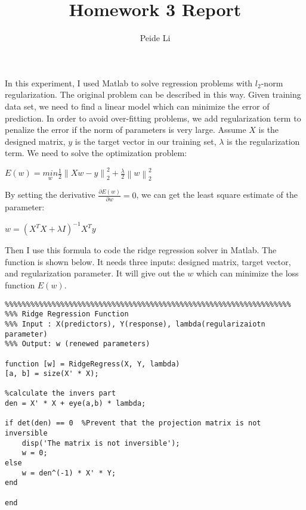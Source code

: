 \documentclass[letterpaper,12pt]{article}
\title{Homework 3 Report}
\author{Peide Li}
\begin{document}
\maketitle

In this experiment, I used Matlab to solve regression problems with $l_{2}$-norm regularization. The original problem can be described in this way. Given training data set, we need to find a linear model which can minimize the error of prediction. In order to avoid over-fitting problems, we add regularization term to penalize the error if the norm of parameters is very large. Assume $X$ is the designed matrix, $y$ is the target vector in our training set, $\lambda$ is the regularization term. We need to solve the optimization problem:
\begin{center}
$E(w) = \underset{w}{min} \frac{1}{2}\left \| Xw - y \right \|^{2}_{2} + \frac{\lambda}{2}\left \| w \right \|^{2}_{2}$
\end{center}
By setting the derivative $\frac{\partial E(w)}{\partial w} = 0$, we can get the least square estimate of the parameter:
\begin{center}
 $w = \left ( X^{T}X + \lambda I \right )^{-1} X^{T}y$
\end{center}
Then I use this formula to code the ridge regression solver in Matlab. The function is shown below. It needs three inputs: designed matrix, target vector, and regularization parameter. It will give out the $w$ which can minimize the loss function $E(w)$.

\begin{lstlisting}  
%%%%%%%%%%%%%%%%%%%%%%%%%%%%%%%%%%%%%%%%%%%%%%%%%%%%%%%%%%%%%%%%%%%
%%% Ridge Regression Function
%%% Input : X(predictors), Y(response), lambda(regularizaiotn parameter)
%%% Output: w (renewed parameters)

function [w] = RidgeRegress(X, Y, lambda)
[a, b] = size(X' * X);

%calculate the invers part
den = X' * X + eye(a,b) * lambda;

if det(den) == 0  %Prevent that the projection matrix is not inversible 
    disp('The matrix is not inversible');
    w = 0;
else
    w = den^(-1) * X' * Y;
end

end
\end{lstlisting}  
\end{document}
